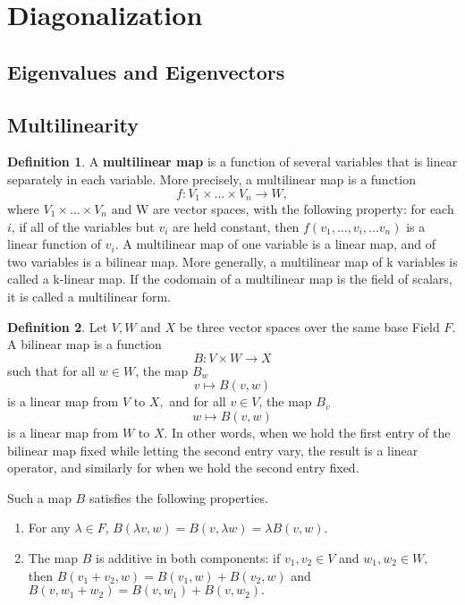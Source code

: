 \documentclass[12pt]{article}
\theoremstyle{definition}
\newtheorem{definition}{Definition}[section]
\theoremstyle{remark}
\begin{document}
\section{Diagonalization}

\subsection{Eigenvalues and Eigenvectors}

\subsection{Multilinearity}
\begin{definition}
    A \textbf{multilinear map} is a function of several variables that is linear separately in each variable.
    More precisely, a multilinear map is a function
    $$f : V_1 \times \hdots \times V_n \rightarrow W,$$
    where $ V_1 \times \hdots \times V_n$ and W are vector spaces, with the following property: for each 
    $i$, if all of the variables but $v_i$ are held constant, then $f(v_1,...,v_i,...v_n)$ is a linear function of $v_i$.
    A multilinear map of one variable is a linear map, and of two variables is a bilinear map. More generally, 
    a multilinear map of k variables is called a k-linear map. If the codomain of a multilinear map is the field 
    of scalars, it is called a multilinear form. 
\end{definition}
\begin{definition}
Let $V, W $ and $X$ be three vector spaces over the same base Field $F$. A bilinear map is a function
$$B : V \times W \to X$$
such that for all $w \in W$, the map $B_w$
$$v \mapsto B(v, w)$$
is a linear map from $V$ to $X,$ and for all $v \in V$, the map $B_v$
$$w \mapsto B(v, w)$$
is a linear map from $W$ to $X.$ In other words, when we hold the first entry of the bilinear map fixed while letting the second entry vary, the result is a linear operator, and similarly for when we hold the second entry fixed.

Such a map $B$ satisfies the following properties.
\begin{enumerate}
    \item For any $\lambda \in F$, $B(\lambda v,w) = B(v, \lambda w) = \lambda B(v, w).$
    \item The map $B$ is additive in both components: if $v_1, v_2 \in V$ and $w_1, w_2 \in W,$ then $B(v_1 + v_2, w) = B(v_1, w) + B(v_2, w)$ and $B(v, w_1 + w_2) = B(v, w_1) + B(v, w_2).$
\end{enumerate}
    
\end{definition}
\end{document}

